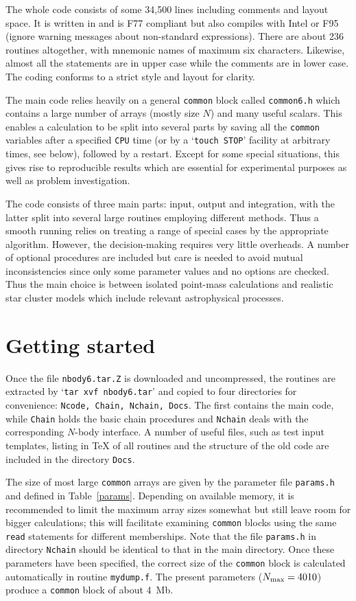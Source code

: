 \documentclass[12pt]{article}
\begin{document}
The whole code consists of some 34,500 lines including comments and layout
space.
It is written in {} and is F77 compliant but also compiles
with Intel or F95 (ignore warning messages about non-standard expressions).
There are about 236 routines altogether, with mnemonic names of maximum six
characters.
Likewise, almost all the {} statements are in upper case while
the comments are in lower case.
The coding conforms to a strict style and layout for clarity.

The main code relies heavily on a general {\tt common} block called
{\tt common6.h} which contains a large number of arrays (mostly size $N$) and
many useful scalars.
This enables a calculation to be split into several parts by saving all the
{\tt common} variables after a specified {\tt CPU} time (or by a
`{\tt touch STOP}' facility at arbitrary times, see below), followed by a
restart.
Except for some special situations, this gives rise to reproducible results
which are essential for experimental purposes as well as problem
investigation.

The code consists of three main parts: input, output and integration, with
the latter split into several large routines employing different methods.
Thus a smooth running relies on treating a range of special cases by the
appropriate algorithm.
However, the decision-making requires very little overheads.
A number of optional procedures are included but care is needed to avoid
mutual inconsistencies since only some parameter values and no options are
checked.
Thus the main choice is between isolated point-mass calculations and
realistic star cluster models which include relevant astrophysical processes.

\section{Getting started}

Once the file {\tt nbody6.tar.Z} is downloaded and uncompressed, the routines
are extracted by `{\tt tar xvf nbody6.tar}' and copied to four directories
for convenience: {\tt Ncode, Chain, Nchain, Docs}.
The first contains the main code, while {\tt Chain} holds the basic chain
procedures and {\tt Nchain} deals with the corresponding $N$-body interface.
A number of useful files, such as test input templates, listing in TeX of all
routines and the structure of the old code {} are included in
the directory {\tt Docs}.

The size of most large {\tt common} arrays are given by the parameter file
{\tt params.h} and defined in Table~\ref{params}.
Depending on available memory, it is recommended to limit the maximum array
sizes somewhat but still leave room for bigger calculations; this will
facilitate examining {\tt common} blocks using the same {\tt read}
statements for different memberships.
Note that the file {\tt params.h} in directory {\tt Nchain} should be
identical to that in the main directory.
Once these parameters have been specified, the correct size of the
{\tt common} block is calculated automatically in routine {\tt mydump.f}.
The present parameters ($N_{\rm max} = 4010$) produce a {\tt common} block
of about 4~Mb.
\end{document}
